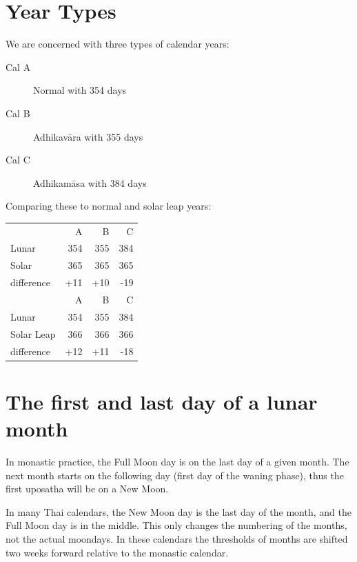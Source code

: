 \documentclass[11pt,oneside]{memoir-article}
\begin{document}
\clearpage

\section{Year Types}
\label{sec-3-1}

\begin{multicols}{2}

We are concerned with three types of calendar years:

\begin{description}
\item[{Cal A}] Normal with 354 days
\item[{Cal B}] Adhikavāra with 355 days
\item[{Cal C}] Adhikamāsa with 384 days
\end{description}

\columnbreak

Comparing these to normal and solar leap years:

\begin{center}
\begin{tabular}{lrrr}
 & A & B & C\\
Lunar & 354 & 355 & 384\\
Solar & 365 & 365 & 365\\
difference & +11 & +10 & -19\\
\hline
 & A & B & C\\
Lunar & 354 & 355 & 384\\
Solar Leap & 366 & 366 & 366\\
difference & +12 & +11 & -18\\
\end{tabular}
\end{center}

\end{multicols}

\section{The first and last day of a lunar month}
\label{sec-3-2}
\label{lunar-month-first-last}

In monastic practice, the Full Moon day is on the last day of a given
month. The next month starts on the following day (first day of the
waning phase), thus the first uposatha will be on a New Moon.

In many Thai calendars, the New Moon day is the last day of the month,
and the Full Moon day is in the middle. This only changes the
numbering of the months, not the actual moondays. In these calendars
the thresholds of months are shifted two weeks forward relative to the
monastic calendar.
\end{document}

